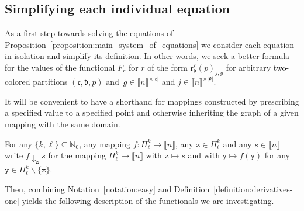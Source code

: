 \documentclass[10pt,a4paper]{amsart}
\numberwithin{equation}{section}
\newcommand{\thefuncx}[1]{F_{#1}}
\newcommand{\funcdef}{\colon}
\newcommand{\nnint}{{\mathbb{N}_0}}
\newcommand{\dwi}[1]{\llbracket{#1}\rrbracket}
\newcommand{\Ssetmonoidalproduct}{\times}
\newcommand{\tsopx}[2]{\Pi^{#1}_{#2}}
\newcommand{\Yc}[1]{\mathfrak{#1}}
\newcommand{\Yp}[1]{\mathtt{#1}}
\newcommand{\Slength}[1]{|#1|}
\newcommand{\therelpoly}[5]{\mathrm{r}^{#1}_{#2}(#3)_{#4,#5}}
\newcommand{\thedim}{n}
\begin{document}
\subsection{Simplifying each individual equation}
\label{section:main-one-simplifications}
{
  \newcommand{\anyrel}{r}
  \newcommand{\thepartition}{p}
  \newcommand{\incol}{\Yc{c}}
  \newcommand{\outcol}{{\Yc{d}}}
  \newcommand{\infree}{g}
  \newcommand{\outfree}{j}
As a first step towards solving the equations of Pro\-po\-si\-tion~\ref{proposition:main_system_of_equations} we consider each equation in isolation  and simplify its  definition. In other words,  we seek a better formula for the values of the functional $\thefuncx{\anyrel}$ for  $\anyrel$ of the form $\therelpoly{\incol}{\outcol}{\thepartition}{\outfree}{\infree}$ for arbitrary two-colored partitions $(\incol,\outcol,\thepartition)$ and~$\infree\in\dwi{\thedim}^{\Ssetmonoidalproduct\Slength{\incol}}$ and $\outfree\in\dwi{\thedim}^{\Ssetmonoidalproduct\Slength{\outcol}}$.
}

It will be convenient to have a shorthand for mappings constructed by prescribing a specified value to a specified point and otherwise inheriting the graph of a given mapping with the same domain.
\begin{Notation}
  \newcommand{\inlen}{k}
  \newcommand{\outlen}{\ell}
  \newcommand{\theind}{f}
  \newcommand{\thepoint}{\Yp{z}}
  \newcommand{\thevalue}{s}
  \newcommand{\thepartition}{p}
  \newcommand{\thealtered}{\theind\downarrow_\thepoint\thevalue}
  \newcommand{\anypoint}{\Yp{y}}
  For any $\{\inlen,\outlen\}\subseteq \nnint$, any mapping $\theind\funcdef\tsopx{\inlen}{\outlen}\to \dwi{\thedim}$, any $\thepoint\in\tsopx{\inlen}{\outlen}$ and any $\thevalue\in\dwi{\thedim}$ write $\thealtered$ for the mapping $\tsopx{\inlen}{\outlen}\to \dwi{\thedim}$ with  $\thepoint\mapsto \thevalue$ and with $\anypoint\mapsto \theind(\anypoint)$ for any $\anypoint\in\tsopx{\inlen}{\outlen}\backslash \{\thepoint\}$.
\end{Notation}
Then, combining Notation~\ref{notation:easy} and Definition~\ref{definition:derivatives-one} yields the following description of the functionals we are investigating.
\end{document}
